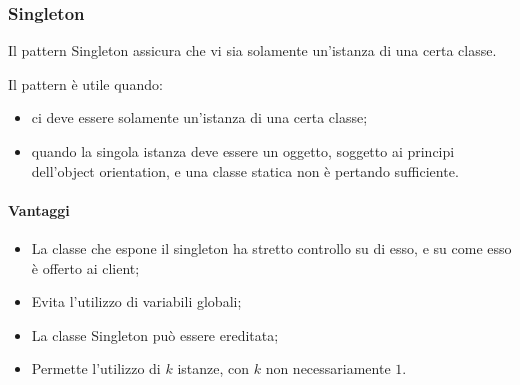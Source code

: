 \subsubsection{Singleton}

Il pattern Singleton assicura che vi sia solamente un'istanza di una certa
classe.

Il pattern è utile quando:

\begin{itemize}
    \item ci deve essere solamente un'istanza di una certa classe;
    \item quando la singola istanza deve essere un oggetto, soggetto ai principi
    dell'object orientation, e una classe statica non è pertando sufficiente.
\end{itemize}

\paragraph{Vantaggi}
\label{par:vantaggi}

\begin{itemize}
    \item La classe che espone il singleton ha stretto controllo su di esso, e
    su come esso è offerto ai client;
    \item Evita l'utilizzo di variabili globali;
    \item La classe Singleton può essere ereditata;
    \item Permette l'utilizzo di $k$ istanze, con $k$ non necessariamente $1$.
\end{itemize}
